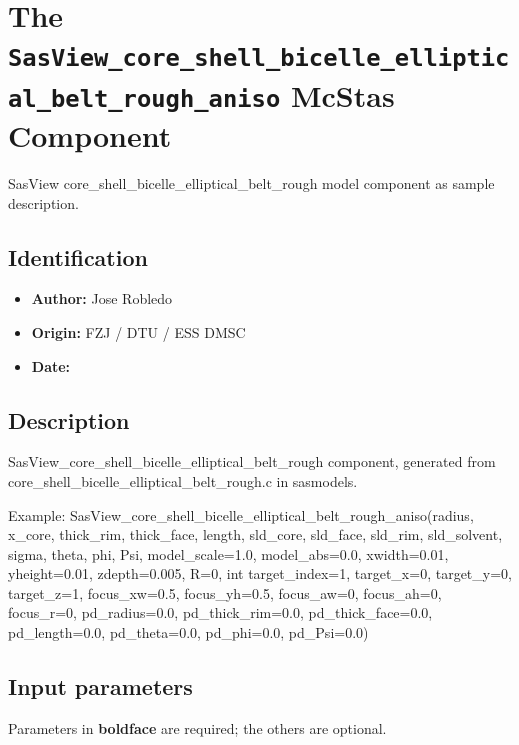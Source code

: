 \section{The \texttt{SasView\_core\_shell\_bicelle\_elliptical\_belt\_rough\_aniso} McStas Component}
SasView core\_shell\_bicelle\_elliptical\_belt\_rough model component as sample description.

\subsection*{Identification}
\begin{itemize}
  \item \textbf{Author:} Jose Robledo
  \item \textbf{Origin:} FZJ / DTU / ESS DMSC
  \item \textbf{Date:} 
\end{itemize}

\subsection*{Description}
SasView\_core\_shell\_bicelle\_elliptical\_belt\_rough component, generated from core\_shell\_bicelle\_elliptical\_belt\_rough.c in sasmodels.

Example: SasView\_core\_shell\_bicelle\_elliptical\_belt\_rough\_aniso(radius, x\_core, thick\_rim, thick\_face, length, sld\_core, sld\_face, sld\_rim, sld\_solvent, sigma, theta, phi, Psi, model\_scale=1.0, model\_abs=0.0, xwidth=0.01, yheight=0.01, zdepth=0.005, R=0, int target\_index=1, target\_x=0, target\_y=0, target\_z=1, focus\_xw=0.5, focus\_yh=0.5, focus\_aw=0, focus\_ah=0, focus\_r=0, pd\_radius=0.0, pd\_thick\_rim=0.0, pd\_thick\_face=0.0, pd\_length=0.0, pd\_theta=0.0, pd\_phi=0.0, pd\_Psi=0.0)

\subsection*{Input parameters}
Parameters in \textbf{boldface} are required; the others are optional.

